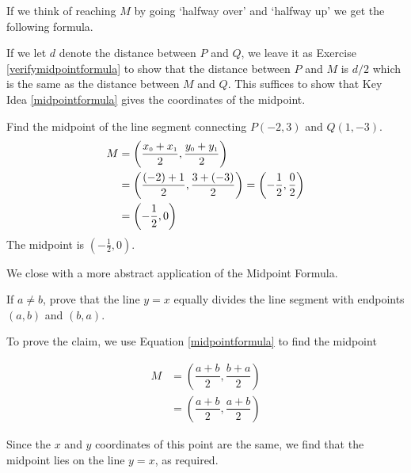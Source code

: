 If we think of reaching $M$ by going `halfway over' and `halfway up' we get the following formula. 

\medskip


\medskip

If we let $d$ denote the distance between $P$ and $Q$, we leave it as Exercise \ref{verifymidpointformula} to show that the distance between $P$ and $M$ is $d/2$ which is the same as the distance between $M$ and $Q$.  This suffices to show that Key Idea \ref{midpointformula} gives the coordinates of the midpoint.

\medskip

{
Find the midpoint of the line segment connecting $P(-2,3)$ and  $Q(1,-3)$.  
}
{
\begin{align*}
 M & = \left( \dfrac{x_{\mbox{\tiny$0$}}+x_{\mbox{\tiny$1$}}}{2},  \dfrac{y_{\mbox{\tiny$0$}}+y_{\mbox{\tiny$1$}}}{2} \right) \\
   & =  \left( \dfrac{(-2)+1}{2},  \dfrac{3+(-3)}{2} \right)  = \left(- \dfrac{1}{2}, \dfrac{0}{2} \right) \\
   & =  \left(- \dfrac{1}{2}, 0 \right) 
\end{align*}
The midpoint is  $\left(- \frac{1}{2}, 0 \right)$.}

\medskip


\label{inversemidpoint}

We close with a more abstract application of the Midpoint Formula.  

\medskip

{
If $a \neq b$, prove that the line $y = x$ equally divides the line segment with endpoints $(a,b)$ and $(b,a)$.
}
{
To prove the claim, we use Equation \ref{midpointformula} to find the midpoint  


\begin{align*}
 M & =  \left( \dfrac{a+b}{2},  \dfrac{b+a}{2} \right) \\
   & =  \left( \dfrac{a+b}{2},  \dfrac{a+b}{2} \right)
\end{align*}

Since the $x$ and $y$ coordinates of this point are the same, we find that the midpoint lies on the line $y=x$, as required. 
}

{}
